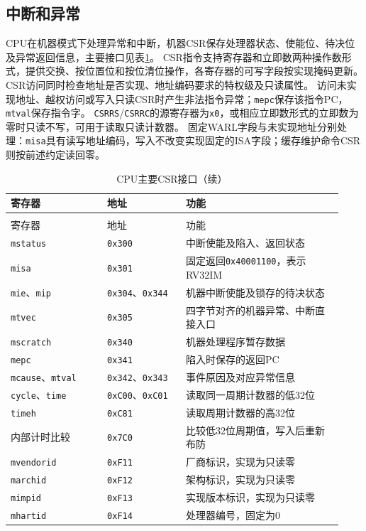 \subsection{中断和异常}

CPU在机器模式下处理异常和中断，机器CSR保存处理器状态、使能位、待决位及异常返回信息\cite{riscv-priv-20260120}，主要接口见表\ref{tbl:cpu-csr}。
CSR指令支持寄存器和立即数两种操作数形式，提供交换、按位置位和按位清位操作，各寄存器的可写字段按实现掩码更新。
CSR访问同时检查地址是否实现、地址编码要求的特权级及只读属性。
访问未实现地址、越权访问或写入只读CSR时产生非法指令异常；\texttt{mepc}保存该指令PC，\texttt{mtval}保存指令字。
\texttt{CSRRS}/\texttt{CSRRC}的源寄存器为\texttt{x0}，或相应立即数形式的立即数为零时只读不写，可用于读取只读计数器。
固定WARL字段与未实现地址分别处理：\texttt{misa}具有读写地址编码，写入不改变实现固定的ISA字段；缓存维护命令CSR则按前述约定读回零。

\begin{reporttable}
\begin{longtable}{@{}p{0.27\linewidth}p{0.22\linewidth}p{0.44\linewidth}@{}}
\caption{CPU主要CSR接口}\label{tbl:cpu-csr}\\
\toprule
寄存器 & 地址 & 功能 \\
\midrule
\endfirsthead
\caption[]{CPU主要CSR接口（续）}\\
\toprule
寄存器 & 地址 & 功能 \\
\midrule
\endhead
\bottomrule
\endfoot
\texttt{mstatus} & \texttt{0x300} & 中断使能及陷入、返回状态 \\
\texttt{misa} & \texttt{0x301} & 固定返回\texttt{0x40001100}，表示RV32IM \\
\texttt{mie}、\texttt{mip} & \texttt{0x304}、\texttt{0x344} & 机器中断使能及锁存的待决状态 \\
\texttt{mtvec} & \texttt{0x305} & 四字节对齐的机器异常、中断直接入口 \\
\texttt{mscratch} & \texttt{0x340} & 机器处理程序暂存数据 \\
\texttt{mepc} & \texttt{0x341} & 陷入时保存的返回PC \\
\texttt{mcause}、\texttt{mtval} & \texttt{0x342}、\texttt{0x343} & 事件原因及对应异常信息 \\
\texttt{cycle}、\texttt{time} & \texttt{0xC00}、\texttt{0xC01} & 读取同一周期计数器的低32位 \\
\texttt{timeh} & \texttt{0xC81} & 读取周期计数器的高32位 \\
内部计时比较 & \texttt{0x7C0} & 比较低32位周期值，写入后重新布防 \\
\texttt{mvendorid} & \texttt{0xF11} & 厂商标识，实现为只读零 \\
\texttt{marchid} & \texttt{0xF12} & 架构标识，实现为只读零 \\
\texttt{mimpid} & \texttt{0xF13} & 实现版本标识，实现为只读零 \\
\texttt{mhartid} & \texttt{0xF14} & 处理器编号，固定为0 \\
\end{longtable}
\end{reporttable}

